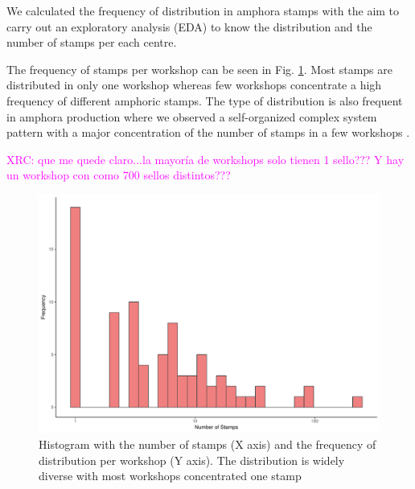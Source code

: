 \documentclass[review]{elsarticle}
\newcommand{\memo}[2]{\textcolor{#1}{#2}}
\newcommand{\xavi}[1]{\memo{magenta}{XRC: #1\\}}
\begin{document}

We calculated the frequency of distribution in amphora stamps with the aim to carry out an exploratory analysis (EDA) to know the distribution and the number of stamps per each centre.  

The frequency of stamps per workshop can be seen in Fig. \ref{stamps}. Most stamps are distributed in only one workshop whereas few workshops concentrate a high frequency of different amphoric stamps. The type of distribution is also frequent in amphora production where we observed a self-organized complex system pattern with a major concentration of the number of stamps in a few workshops \citep{bayesian_2018,coto-sarmiento_identifying_2018}.


\xavi{que me quede claro...la mayoría de workshops solo tienen 1 sello??? Y hay un workshop con como 700 sellos distintos??? }

\begin{figure}[htp]
	\centering
\includegraphics[width=\linewidth]{figs/frequencystamp.pdf}
\caption{Histogram with the number of stamps (X axis) and the frequency of distribution per workshop (Y axis). The distribution is widely diverse with most workshops concentrated one stamp}
\label{stamps}
\end{figure} 
\end{document}
